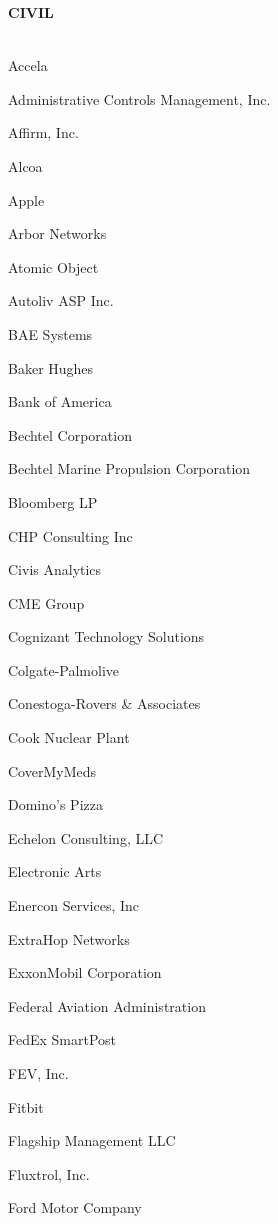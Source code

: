\documentclass[twoside]{article}
\begin{document}
\begin{center}
\begin{multicols}{5}
        {\fontsize{14}{16}\selectfont \bf CIVIL}\\
        \vspace{-1em}
        ~\hrulefill~
        \vspace{-.9em}
        \begin{FlushLeft}
        \begin{compactitem}
        \item Accela
\item Administrative Controls Management, Inc.
\item Affirm, Inc.
\item Alcoa
\item Apple
\item Arbor Networks
\item Atomic Object
\item Autoliv ASP Inc.
\item BAE Systems
\item Baker Hughes
\item Bank of America
\item Bechtel Corporation
\item Bechtel Marine Propulsion Corporation
\item Bloomberg LP
\item CHP Consulting Inc
\item Civis Analytics
\item CME Group
\item Cognizant Technology Solutions
\item Colgate-Palmolive
\item Conestoga-Rovers \& Associates
\item Cook Nuclear Plant
\item CoverMyMeds
\item Domino's Pizza
\item Echelon Consulting, LLC
\item Electronic Arts
\item Enercon Services, Inc
\item ExtraHop Networks
\item ExxonMobil Corporation
\item Federal Aviation Administration
\item FedEx SmartPost
\item FEV, Inc.
\item Fitbit
\item Flagship Management LLC
\item Fluxtrol, Inc.
\item Ford Motor Company

\end{compactitem}
\end{FlushLeft}
\end{multicols}
\end{center}
\end{document}
